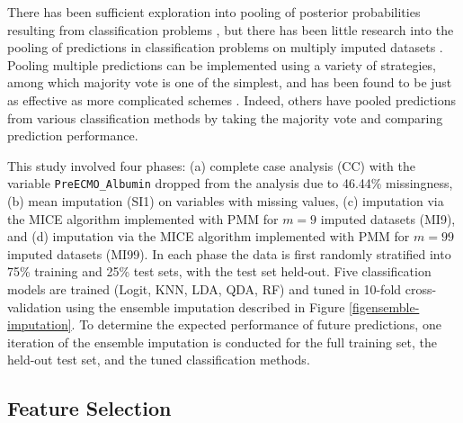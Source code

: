 \documentclass[12pt,]{article}
\begin{document}
There has been sufficient exploration into pooling of posterior
probabilities resulting from classification problems
\autocite{kittler_combining_1996}\autocite{james_majority_1998}, but
there has been little research into the pooling of predictions in
classification problems on multiply imputed datasets
\autocite{belanche_handling_2014}. Pooling multiple predictions can be
implemented using a variety of strategies, among which majority vote is
one of the simplest, and has been found to be just as effective as more
complicated schemes \autocite{lam_optimal_1995}. Indeed, others have
pooled predictions from various classification methods by taking the
majority vote
\autocite{james_majority_1998}\autocite{belanche_handling_2014} and
comparing prediction performance.

This study involved four phases: (a) complete case analysis (CC) with
the variable \texttt{PreECMO\_Albumin} dropped from the analysis due to
46.44\% missingness, (b) mean imputation (SI1) on variables with missing
values, (c) imputation via the MICE algorithm implemented with PMM for
\(m=9\) imputed datasets (MI9), and (d) imputation via the MICE
algorithm implemented with PMM for \(m=99\) imputed datasets (MI99). In
each phase the data is first randomly stratified into 75\% training and
25\% test sets, with the test set held-out. Five classification models
are trained (Logit, KNN, LDA, QDA, RF) and tuned in 10-fold
cross-validation using the ensemble imputation described in Figure
\ref{figensemble-imputation}. To determine the expected performance of
future predictions, one iteration of the ensemble imputation is
conducted for the full training set, the held-out test set, and the
tuned classification methods.

\subsection{Feature Selection}\label{feature-selection}
\end{document}
